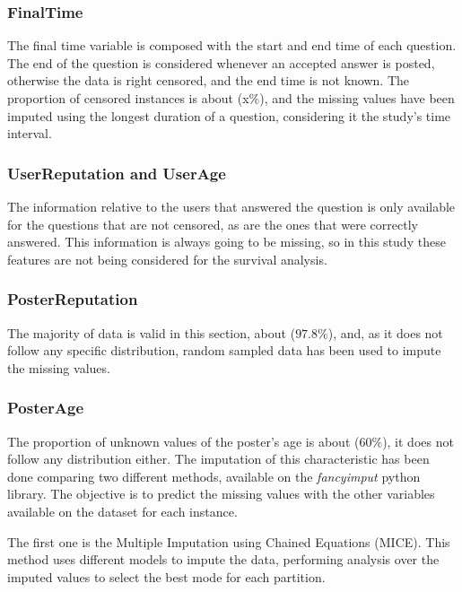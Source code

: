 \documentclass[11pt]{book} %
\begin{document}
    \subsubsection{FinalTime}

      The final time variable is composed with the start and end time of each question. The end of the question is considered whenever an accepted answer is posted, otherwise the data is right censored, and the end time is not known. The proportion of censored instances is about (x\%), and the missing values have been imputed using the longest duration of a question, considering it the study's time interval.

    \subsubsection{UserReputation and UserAge}

      The information relative to the users that answered the question is only available for the questions that are not censored, as are the ones that were correctly answered. This information is always going to be missing, so in this study these features are not being considered for the survival analysis.

    \subsubsection{PosterReputation}

      The majority of data is valid in this section, about ($97.8\%$), and, as it does not follow any specific distribution, random sampled data has been used to impute the missing values.

    \subsubsection{PosterAge}

      The proportion of unknown values of the poster's age is about ($60\%$), it does not follow any distribution either. The imputation of this characteristic has been done comparing two different methods, available on the \emph{fancyimput} python library. The objective is to predict the missing values with the other variables available on the dataset for each instance.

      The first one is the Multiple Imputation using Chained Equations (MICE). This method uses different models to impute the data, performing analysis over the imputed values to select the best mode for each partition.
\end{document}

